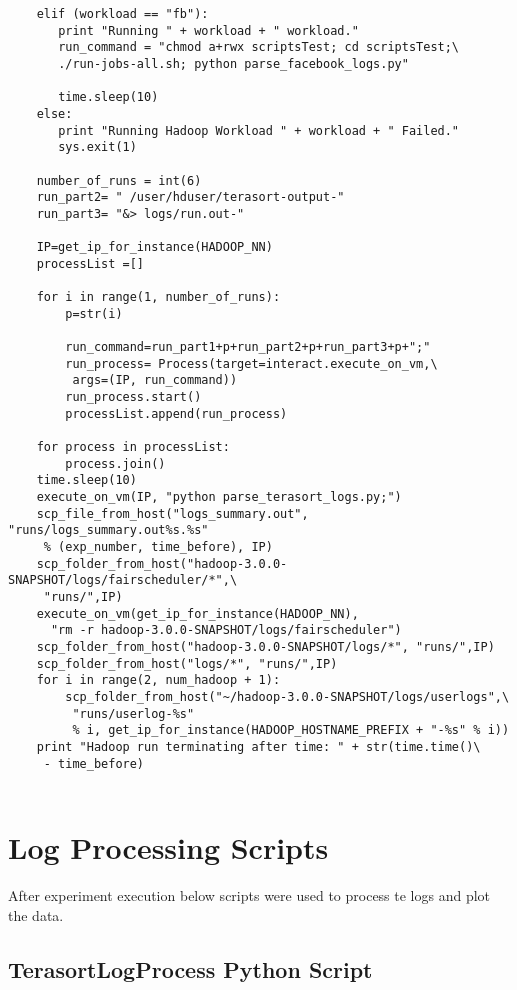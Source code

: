 \begin{verbatim}
    elif (workload == "fb"):
       print "Running " + workload + " workload."
       run_command = "chmod a+rwx scriptsTest; cd scriptsTest;\
       ./run-jobs-all.sh; python parse_facebook_logs.py"
       
       time.sleep(10)
    else:
       print "Running Hadoop Workload " + workload + " Failed."
       sys.exit(1)
    
    number_of_runs = int(6)
    run_part2= " /user/hduser/terasort-output-"
    run_part3= "&> logs/run.out-"

    IP=get_ip_for_instance(HADOOP_NN)
    processList =[]   
    
    for i in range(1, number_of_runs):
        p=str(i)
        
        run_command=run_part1+p+run_part2+p+run_part3+p+";"        
        run_process= Process(target=interact.execute_on_vm,\
         args=(IP, run_command))
        run_process.start()
        processList.append(run_process)
    
    for process in processList:
        process.join()
    time.sleep(10)
    execute_on_vm(IP, "python parse_terasort_logs.py;")
    scp_file_from_host("logs_summary.out", "runs/logs_summary.out%s.%s"
     % (exp_number, time_before), IP)
    scp_folder_from_host("hadoop-3.0.0-SNAPSHOT/logs/fairscheduler/*",\
     "runs/",IP)
    execute_on_vm(get_ip_for_instance(HADOOP_NN), 
      "rm -r hadoop-3.0.0-SNAPSHOT/logs/fairscheduler")
    scp_folder_from_host("hadoop-3.0.0-SNAPSHOT/logs/*", "runs/",IP)
    scp_folder_from_host("logs/*", "runs/",IP)
    for i in range(2, num_hadoop + 1):
        scp_folder_from_host("~/hadoop-3.0.0-SNAPSHOT/logs/userlogs",\
         "runs/userlog-%s"
         % i, get_ip_for_instance(HADOOP_HOSTNAME_PREFIX + "-%s" % i))
    print "Hadoop run terminating after time: " + str(time.time()\
     - time_before)


\end{verbatim}






\section{Log Processing Scripts}
After experiment execution below scripts were used to process te logs and plot the data. 


\subsection{TerasortLogProcess Python Script}

